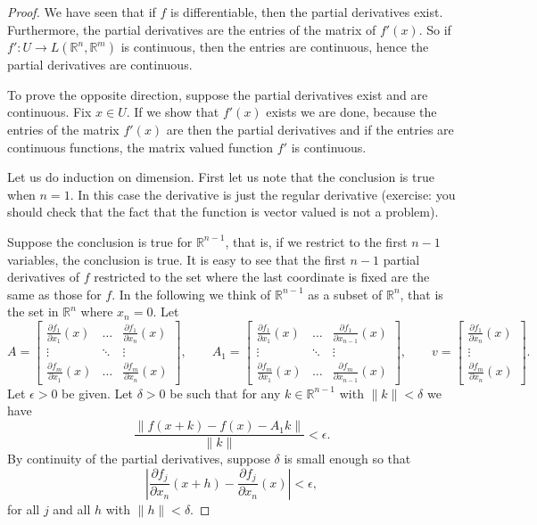 \documentclass[12pt]{book}
\newcommand{\snorm}[1]{\lVert {#1} \rVert}
\newcommand{\abs}[1]{\left\lvert {#1} \right\rvert}
\newcommand{\R}{{\mathbb{R}}}
\theoremstyle{plain}
\theoremstyle{remark}
\theoremstyle{definition}
\theoremstyle{exercise}
\theoremstyle{example}
\begin{document}
\begin{proof}
We have seen that if $f$ is differentiable, then
the partial derivatives exist.  Furthermore, the partial
derivatives are the entries of the matrix of $f'(x)$.  So if
$f' \colon U \to L(\R^n,\R^m)$ is continuous, then the entries are
continuous, hence the partial derivatives are continuous.

To prove the opposite direction,
suppose the partial derivatives exist and are continuous.
Fix $x \in U$.  If we show that $f'(x)$ exists we are done, because
the entries of the matrix $f'(x)$ are then the partial derivatives and if
the entries are continuous functions, the matrix valued function $f'$ is
continuous.

Let us do induction on dimension.  First let us note that
the conclusion is true when $n=1$.  In this case the derivative
is just the regular derivative (exercise: you should check that the fact
that the function is vector valued is not a problem).

Suppose the conclusion is true for $\R^{n-1}$,
that is,
if we restrict to the first $n-1$ variables, the conclusion is true.
It is easy to see that the first $n-1$
partial derivatives of $f$ restricted to the set where the last coordinate is
fixed are the same as those for $f$.
In the following
we think of $\R^{n-1}$ as a subset of $\R^n$, that is the set in $\R^n$ where $x_n = 0$.
Let
\begin{equation*}
A = 
\begin{bmatrix}
\frac{\partial f_1}{\partial x_1}(x)
& \ldots &
\frac{\partial f_1}{\partial x_n}(x)
\\
\vdots & \ddots & \vdots
\\
\frac{\partial f_m}{\partial x_1}(x)
& \ldots &
\frac{\partial f_m}{\partial x_n}(x)
\end{bmatrix} ,
\qquad
A_1 = 
\begin{bmatrix}
\frac{\partial f_1}{\partial x_1}(x)
& \ldots &
\frac{\partial f_1}{\partial x_{n-1}}(x)
\\
\vdots & \ddots & \vdots
\\
\frac{\partial f_m}{\partial x_1}(x)
& \ldots &
\frac{\partial f_m}{\partial x_{n-1}}(x)
\end{bmatrix} ,
\qquad
v = 
\begin{bmatrix}
\frac{\partial f_1}{\partial x_n}(x)
\\
\vdots
\\
\frac{\partial f_m}{\partial x_n}(x)
\end{bmatrix} .
\end{equation*}
Let $\epsilon > 0$ be given.  Let $\delta > 0$ be such that
for any $k \in \R^{n-1}$ with $\snorm{k} < \delta$ we have
\begin{equation*}
\frac{\snorm{f(x+k) - f(x) - A_1k}}{\snorm{k}} < \epsilon .
\end{equation*}
By continuity of the partial derivatives, suppose $\delta$ is small
enough so that
\begin{equation*}
\abs{\frac{\partial f_j}{\partial x_n}(x+h)
      - \frac{\partial f_j}{\partial x_n}(x)} < \epsilon ,
\end{equation*}
for all $j$ and all $h$ with $\snorm{h} < \delta$.


\end{proof}
\end{document}
